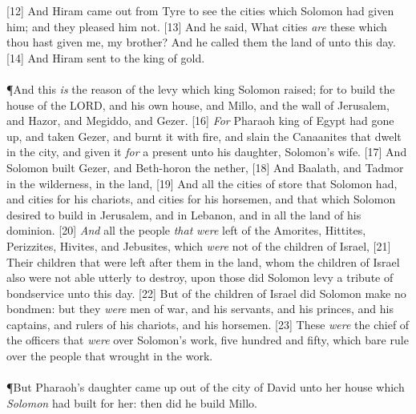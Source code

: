 [12] \textcolor[cmyk]{0.99998,1,0,0}{And Hiram came out from Tyre to see the cities which Solomon had given him; and they pleased him not.}
[13] \textcolor[cmyk]{0.99998,1,0,0}{And he said, What cities \emph{are} these which thou hast given me, my brother? And he called them the land of  unto this day.}
[14] \textcolor[cmyk]{0.99998,1,0,0}{And Hiram sent to the king  of gold.}\\
\\
\P \textcolor[cmyk]{0.99998,1,0,0}{And this \emph{is} the reason of the levy which king Solomon raised; for to build the house of the LORD, and his own house, and Millo, and the wall of Jerusalem, and Hazor, and Megiddo, and Gezer.}
[16] \textcolor[cmyk]{0.99998,1,0,0}{\emph{For} Pharaoh king of Egypt had gone up, and taken Gezer, and burnt it with fire, and slain the Canaanites that dwelt in the city, and given it \emph{for} a present unto his daughter, Solomon's wife.}
[17] \textcolor[cmyk]{0.99998,1,0,0}{And Solomon built Gezer, and Beth-horon the nether,}
[18] \textcolor[cmyk]{0.99998,1,0,0}{And Baalath, and Tadmor in the wilderness, in the land,}
[19] \textcolor[cmyk]{0.99998,1,0,0}{And all the cities of store that Solomon had, and cities for his chariots, and cities for his horsemen, and that which Solomon desired to build in Jerusalem, and in Lebanon, and in all the land of his dominion.}
[20] \textcolor[cmyk]{0.99998,1,0,0}{\emph{And} all the people \emph{that} \emph{were} left of the Amorites, Hittites, Perizzites, Hivites, and Jebusites, which \emph{were} not of the children of Israel,}
[21] \textcolor[cmyk]{0.99998,1,0,0}{Their children that were left after them in the land, whom the children of Israel also were not able utterly to destroy, upon those did Solomon levy a tribute of bondservice unto this day.}
[22] \textcolor[cmyk]{0.99998,1,0,0}{But of the children of Israel did Solomon make no bondmen: but they \emph{were} men of war, and his servants, and his princes, and his captains, and rulers of his chariots, and his horsemen.}
[23] \textcolor[cmyk]{0.99998,1,0,0}{These \emph{were} the chief of the officers that \emph{were} over Solomon's work, five hundred and fifty, which bare rule over the people that wrought in the work.}\\
\\
\P \textcolor[cmyk]{0.99998,1,0,0}{But Pharaoh's daughter came up out of the city of David unto her house which \emph{Solomon} had built for her: then did he build Millo.}\\
